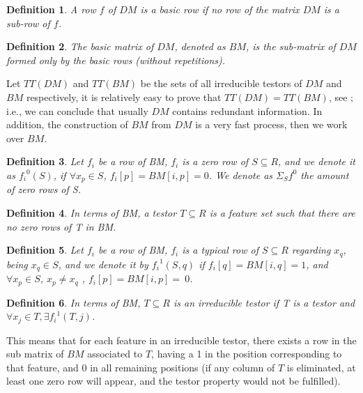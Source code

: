 \documentclass[conference]{IEEEtran}
\newtheorem{definition}{Definition}
\begin{document}
\begin{definition}
A row $f$ of $DM$ is a basic row if no row of the matrix $DM$ is a sub-row of $f$. 
\end{definition}

\begin{definition}
The basic matrix of $DM$, denoted as $BM$, is the sub-matrix of $DM$ formed only by the basic rows (without 
repetitions).

\end{definition}

Let $TT(DM)$ and $TT(BM)$ be the sets of all irreducible testors of $DM$ and $BM$ respectively, it is 
relatively easy to prove that $TT(DM)=TT(BM)$, see \cite{Lazo95}; i.e., we can conclude that usually $DM$ 
contains redundant information. In addition, the construction of $BM$ from $DM$ is a very fast process, 
then we work over $BM$.


\begin{definition} \label{def21} Let $f_i$ be a row of BM, $f_i$ is a zero row of $S \subseteq R$, and we denote it as ${f_i}^0 (S)$, if $\forall x_p \in S$, $f_i [p] = BM [i, p] = 0$. We denote as $\Sigma_S f^0$  the amount of zero rows of S.
\end{definition}
\begin{definition} \label{def22} In terms of BM, a testor $T \subseteq R$ is a feature set such that there
are no zero rows of T in BM. 
\end{definition}
\begin{definition} \label{def23} Let $f_i$ be a row of BM, $f_i$ is a typical row of $S \subseteq R$ regarding $x_q$, being $x_q \in S$, and we denote it by ${f_i}^1 (S,q)$ if $f_i [q] = BM [i, q] = 1$, and $\forall x_p \in S$, $x_p \neq x_q$ , $f_i [p] = BM [i, p] =~0$.
\end{definition}

\begin{definition} \label{def24} In terms of BM, $T \subseteq R$ is an irreducible testor if T is a testor and
$\forall x_j \in T, \exists {f_i}^1 (T, j)$.
\end{definition}

This means that for each feature in an irreducible testor, there exists a row in 
the sub matrix of $BM$ associated to $T$, having a 1 in the position corresponding
to that feature, and 0 in all remaining positions (if any column of $T$ is eliminated, 
at least one zero row will appear, and the testor property would not be fulfilled). 
\end{document}
